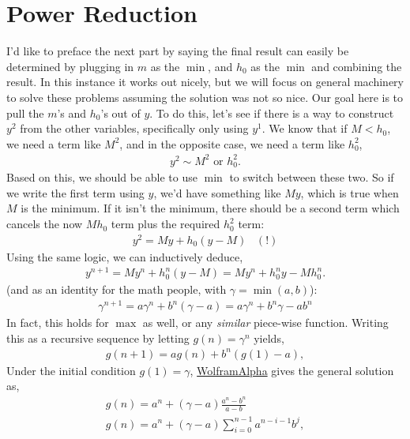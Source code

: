 \section{Power Reduction}
	I'd like to preface the next part by saying the final result can easily be determined by plugging in $m$ as the $\min$, and $h_0$ as the $\min$ and combining the result. In this instance it works out nicely, but we will focus on general machinery to solve these problems assuming the solution was not so nice. Our goal here is to pull the $m$'s and $h_0$'s out of $y$. To do this, let's see if there is a way to construct $y^2$ from the other variables, specifically only using $y^1$. We know that if $M < h_0$, we need a term like $M^2$, and in the opposite case, we need a term like $h_0^2$,
	\begin{align}
		y^2 \sim M^2 \text{ or } h_0^2.
	\end{align}
	Based on this, we should be able to use $\min$ to switch between these two. So if we write the first term using $y$, we'd have something like $My$, which is true when $M$ is the minimum. If it isn't the minimum, there should be a second term which cancels the now $Mh_0$ term plus the required $h_0^2$ term:
	\begin{align}
		y^2 = My + h_0(y - M)\,\,\,\,\,(!)
	\end{align}
	Using the same logic, we can inductively deduce,
	\begin{align}
		\boxed{y^{n+1} = My^n + h_0^n(y - M) = My^n + h_0^ny - Mh_0^n.}
	\end{align}
	(and as an identity for the math people, with $\gamma = \min(a, b)$):
	\begin{align}
		\boxed{\gamma^{n+1} = a\gamma^n + b^n(\gamma - a) = a\gamma^n + b^n\gamma - ab^n}
	\end{align}
	In fact, this holds for $\max$ as well, or any \emph{similar} piece-wise function.
	Writing this as a recursive sequence by letting $g(n)=\gamma^n$ yields,
	\begin{align}
		g(n+1) = ag(n) + b^n(g(1) - a),
	\end{align}
	Under the initial condition $g(1)=\gamma$, \href{https://www.wolframalpha.com/input/?i=g%28n%2B1%29%3Da*g%28n%29%2Bb%5En%28C-a%29}{WolframAlpha} gives the general solution as,
	\begin{align}
		g(n) = a^n + (\gamma - a)\frac{a^n - b^n}{a - b} \\
		\boxed{g(n) = a^n + (\gamma - a)\sum_{i=0}^{n-1} a^{n-i-1}b^j,}
	\end{align}
